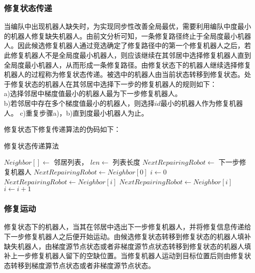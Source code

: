 \subsubsection{修复状态传递}
当编队中出现机器人缺失时，为实现同步性改善全局最优，需要利用编队中度最小的机器人修复缺失机器人。由前文分析可知，一条修复路径终止于全局度最小机器人。因此候选修复机器人通过竞选确定了修复路径中的第一个修复机器人之后，若此修复机器人不是全局度最小机器人，则应该继续在其邻居中选择修复机器人直到全局度最小机器人，从而形成一条修复路径。由修复状态下的机器人继续选择修复机器人的过程称为修复状态传递。被选中的机器人由当前状态转移到修复状态。处于修复状态的机器人在其邻居中选择下一步的修复机器人的规则如下：\\
\indent a)选择邻居中梯度值最小的机器人最为下一步修复机器人。\\
\indent b)若邻居中存在多个梯度值最小的机器人，则选择$id$最小的机器人作为修复机器人。
\indent c)重复步骤a)，b)直到度最小机器人为止。

修复状态下修复传递算法的伪码如下：\\
\begin{algorithm}
	\caption{修复状态传递算法}
	\label{algorithm:repairing_status_deliever}
	\begin{algorithmic}[1]
		\Require $Neighbor[] \leftarrow$ 邻居列表， $len \leftarrow$ 列表长度
		\Ensure $NextRepairingRobot \leftarrow$ 下一步修复机器人
			\State $NextRepairingRobot \gets Neighbor[0]$
			\State $i \gets 0$
					\State $NextRepairingRobot \gets Neighbor[i]$
				\Else
						\State $NextRepairingRobot \gets Neighbor[i]$
					\EndIf
				\EndIf
				\State $i \gets i+1$
			\EndWhile
			\State {}
		\EndFunction			
	\end{algorithmic}	
\end{algorithm}
	
\subsubsection{修复运动}
修复状态下的机器人，当其在邻居中选出下一步修复机器人，并将修复信息传递给下一步修复机器人之后便开始运动。由候选修复状态转移到修复状态的机器人填补缺失机器人，由梯度源节点状态或者非梯度源节点状态转移到修复状态的机器人填补上一步修复机器人留下的空缺位置。当修复机器人运动到目标位置后则由修复状态转移到梯度源节点状态或者非梯度源节点状态。


